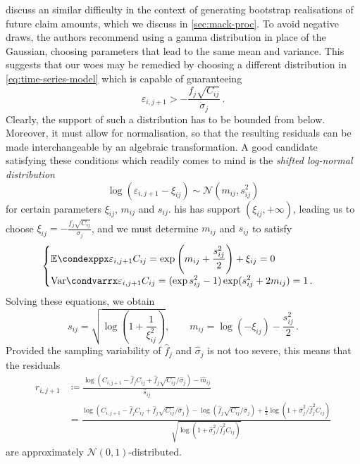 \documentclass[a4paper]{book}
\begin{document}
\Textcite[238]{england:dist} discuss an similar difficulty in the context of generating bootstrap realisations of future claim amounts, which we discuss in \cref{sec:mack-proc}. To avoid negative draws, the authors recommend using a gamma distribution in place of the Gaussian, choosing parameters that lead to the same mean and variance. This suggests that our woes may be remedied by choosing a different distribution in \cref{eq:time-series-model} which is capable of guaranteeing
\begin{equation} \label{eq:lower-limit-err}
  \varepsilon_{i, j + 1} > -\frac{f_j \sqrt{C_{ij}}}{\sigma_j} \,.
\end{equation}
Clearly, the support of such a distribution has to be bounded from below. Moreover, it must allow for normalisation, so that the resulting residuals can be made interchangeable by an algebraic transformation. A good candidate satisfying these conditions which readily comes to mind is the \emph{shifted log-normal distribution}
\begin{equation}
  \log(\varepsilon_{i, j + 1} - \xi_{ij}) \sim \mathcal{N}(m_{ij}, s_{ij}^2)
\end{equation}
for certain parameters $\xi_{ij}$, $m_{ij}$ and $s_{ij}$. his has support $(\xi_{ij}, +\infty)$, leading us to choose $\xi_{ij} = -\frac{f_j \sqrt{C_{ij}}}{\sigma_j}$, and we must determine $m_{ij}$ and $s_{ij}$ to satisfy
\begin{equation}
  \begin{cases}
    \displaystyle \condexpp{\varepsilon_{i, j + 1}}{C_{ij}} = \exp \left( m_{ij} + \frac{s_{ij}^2}{2} \right) + \xi_{ij} = 0 \\
    \displaystyle \condvarr{\varepsilon_{i, j + 1}}{C_{ij}} = (\exp{s_{ij}^2} - 1) \exp(s_{ij}^2 + 2 m_{ij}) = 1 \,.
  \end{cases}
\end{equation}
Solving these equations, we obtain
\begin{equation}
  s_{ij} = \sqrt{\log \left( 1 + \frac{1}{\xi^2_{ij}} \right)}, \qquad m_{ij} = \log(-\xi_{ij}) - \frac{s^2_{ij}}{2} \,.
\end{equation}
Provided the sampling variability of $\widehat{f}_j$ and $\widehat{\sigma}_j$ is not too severe, this means that the residuals
\begin{align} \label{eq:log-normal-resids}
  r_{i, j + 1}
   & \coloneqq \frac{\log \left( C_{i, j + 1} - \widehat{f}_j C_{ij} + \widehat{f}_j \sqrt{C_{ij}} / \widehat{\sigma}_j \right) - \widehat{m}_{ij}}{\widehat{s}_{ij}}                                                                                                                                                                               \\
   & = \frac{\log \left( C_{i, j + 1} - \widehat{f}_j C_{ij} + \widehat{f}_j \sqrt{C_{ij}} / \widehat{\sigma}_j \right) - \log(\widehat{f}_j \sqrt{C_{ij}} / \widehat{\sigma}_j) + \frac{1}{2} \log \left( 1 + \widehat{\sigma}^2_j / \widehat{f}^2_j C_{ij} \right)}{\sqrt{\log \left( 1 + \widehat{\sigma}^2_j / \widehat{f}^2_j C_{ij} \right)}}
\end{align}
are approximately $\mathcal{N}(0, 1)$-distributed.
\end{document}
